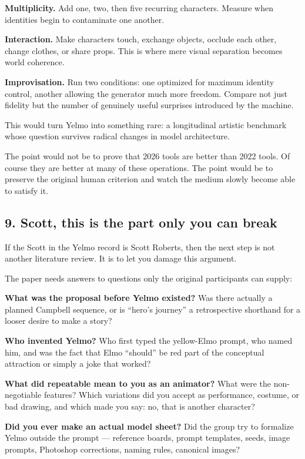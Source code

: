 \documentclass[
]{article}
\begin{document}
\textbf{Multiplicity.} Add one, two, then five recurring characters.
Measure when identities begin to contaminate one another.

\textbf{Interaction.} Make characters touch, exchange objects, occlude
each other, change clothes, or share props. This is where mere visual
separation becomes world coherence.

\textbf{Improvisation.} Run two conditions: one optimized for maximum
identity control, another allowing the generator much more freedom.
Compare not just fidelity but the number of genuinely useful surprises
introduced by the machine.

This would turn Yelmo into something rare: a longitudinal artistic
benchmark whose question survives radical changes in model architecture.

The point would not be to prove that 2026 tools are better than 2022
tools. Of course they are better at many of these operations. The point
would be to preserve the original human criterion and watch the medium
slowly become able to satisfy it.

\subsection{9. Scott, this is the part only you can
break}\label{scott-this-is-the-part-only-you-can-break}

If the Scott in the Yelmo record is Scott Roberts, then the next step is
not another literature review. It is to let you damage this argument.

The paper needs answers to questions only the original participants can
supply:

\textbf{What was the proposal before Yelmo existed?} Was there actually
a planned Campbell sequence, or is ``hero's journey'' a retrospective
shorthand for a looser desire to make a story?

\textbf{Who invented Yelmo?} Who first typed the yellow-Elmo prompt, who
named him, and was the fact that Elmo ``should'' be red part of the
conceptual attraction or simply a joke that worked?

\textbf{What did repeatable mean to you as an animator?} What were the
non-negotiable features? Which variations did you accept as performance,
costume, or bad drawing, and which made you say: no, that is another
character?

\textbf{Did you ever make an actual model sheet?} Did the group try to
formalize Yelmo outside the prompt --- reference boards, prompt
templates, seeds, image prompts, Photoshop corrections, naming rules,
canonical images?
\end{document}
